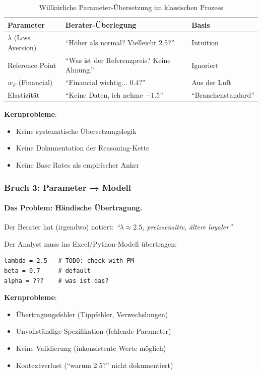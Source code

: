 \begin{table}[h]
\centering
\caption{Willkürliche Parameter-Übersetzung im klassischen Prozess}
\small
\begin{tabular}{@{}lll@{}}
\toprule
\textbf{Parameter} & \textbf{Berater-Überlegung} & \textbf{Basis} \\
\midrule
$\lambda$ (Loss Aversion) & ``Höher als normal? Vielleicht 2.5?'' & Intuition \\
Reference Point & ``Was ist der Referenzpreis? Keine Ahnung.'' & Ignoriert \\
$w_F$ (Financial) & ``Financial wichtig... 0.4?'' & Aus der Luft \\
Elastizität & ``Keine Daten, ich nehme $-1.5$'' & ``Branchenstandard'' \\
\bottomrule
\end{tabular}
\end{table}

\textbf{Kernprobleme}:
\begin{itemize}
    \item Keine systematische Übersetzungslogik
    \item Keine Dokumentation der Reasoning-Kette
    \item Keine Base Rates als empirischer Anker
\end{itemize}

\subsubsection{Bruch 3: Parameter → Modell}

\paragraph{Das Problem: Händische Übertragung.}

Der Berater hat (irgendwo) notiert: \textit{``$\lambda \approx 2.5$, preissensitiv, ältere loyaler''}

Der Analyst muss ins Excel/Python-Modell übertragen:

\begin{verbatim}
lambda = 2.5   # TODO: check with PM
beta = 0.7     # default
alpha = ???    # was ist das?
\end{verbatim}

\textbf{Kernprobleme}:
\begin{itemize}
    \item Übertragungsfehler (Tippfehler, Verwechslungen)
    \item Unvollständige Spezifikation (fehlende Parameter)
    \item Keine Validierung (inkonsistente Werte möglich)
    \item Kontextverlust (``warum 2.5?'' nicht dokumentiert)
\end{itemize}

